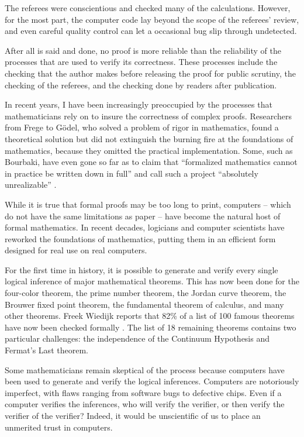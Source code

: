 The referees were conscientious and checked many of the
calculations.  However, for the most part, the computer code lay beyond the scope of the referees' review, and even careful quality control can let a occasional bug slip through undetected.


After all is said and done, no proof is more reliable than the
reliability of the processes that are used to verify its
correctness.  These processes include the checking that the author
makes before releasing the proof for public scrutiny, the checking
of the referees, and the checking done by readers after publication.

In recent years, I have been increasingly preoccupied by the
processes that mathematicians rely on to insure the correctness of complex
proofs. Researchers from Frege to G\"odel, who solved a problem of
rigor in mathematics, found a theoretical solution but did not
extinguish the burning fire at the foundations of mathematics,
because they omitted the practical implementation. Some, such as
Bourbaki, have even gone so far as to claim that ``formalized
mathematics cannot in practice be written down in full'' and call
such a project
``absolutely unrealizable'' \cite[p 10,11]{Bour:68:Sets}. %

While it is true that formal proofs may be too long to print,
computers -- which do not have the same limitations as paper -- have
become the natural host of formal mathematics. In recent decades,
logicians and computer scientists have reworked the foundations of
mathematics, putting them in an efficient form designed for real use
on real computers.

For the first time in history, it is possible to generate and verify
every single logical inference of major mathematical theorems.  This
has now been done for the four-color theorem, the prime number
theorem, the Jordan curve theorem, the Brouwer fixed point theorem,
the fundamental theorem of calculus, and many other theorems.  Freek
Wiedijk reports that 82\% of a list of 100 famous theorems have now
been checked formally \cite{wiedijk:100}.  The list of 18 remaining theorems contains two particular challenges: the independence of the Continuum Hypothesis and Fermat's Last theorem.

Some mathematicians remain skeptical of the process because
computers have been used to generate and verify the logical
inferences.  Computers are notoriously imperfect, with flaws ranging
from software bugs to defective chips.  Even if a computer verifies
the inferences, who will verify the verifier, or then verify the
verifier of the verifier?  
Indeed, it would be unscientific of us to
place an unmerited trust in computers.

